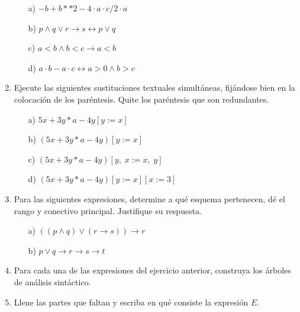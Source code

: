 \documentclass[letterpaper,11pt]{article}
\begin{document}
\begin{enumerate}
    \begin{itemize}
        \item[a)] $-b + b * * 2 - 4 \cdot a \cdot c / 2 \cdot a$ 
        \item[b)] $p \land q \lor r \rightarrow s \leftrightarrow p \lor q$
        \item[c)] $a < b \land b < c \rightarrow a < b$
        \item[d)] $a \cdot b - a \cdot c \leftrightarrow a > 0 \land b > c$
    \end{itemize}

    \item Ejecute las siguientes sustituciones textuales simultáneas, fijándose
    bien en la colocación de los paréntesis. Quite los paréntesis que son 
    redundantes.

    \begin{itemize}
        \item[a)] $5x + 3y * a - 4y[y := x]$
        \item[b)] $(5x + 3y * a - 4y)[y := x]$
        \item[c)] $(5x + 3y * a - 4y)[y, \; x := x, \;y]$
        \item[d)] $(5x + 3y * a - 4y)[y := x][x := 3]$
    \end{itemize}

    \item Para las siguientes expresiones, determine a qué esquema pertenecen,
    dé el rango y conectivo principal. Justifique su respuesta.

    \begin{itemize}
        \item[a)] $((p \land q) \lor (r \rightarrow s)) \rightarrow r$
        \item[b)] $p \lor q \rightarrow r \rightarrow s \rightarrow t$
    \end{itemize}

    \item Para cada una de las expresiones del ejercicio anterior, construya
    los árboles de análisis sintáctico.

    \item Llene las partes que faltan y escriba en qué consiste la expresión 
    $E$.


\end{enumerate}
\end{document}
